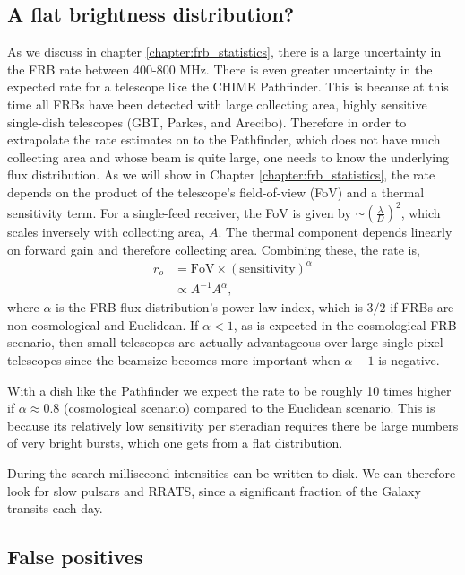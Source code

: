 \subsection{A flat brightness distribution?}
As we discuss in chapter \ref{chapter:frb_statistics}, there is 
a large uncertainty in the FRB rate between 400-800 MHz. There 
is even greater uncertainty in the expected rate for a 
telescope like the CHIME Pathfinder. This is because at this time
all FRBs
have been detected with large collecting area, highly sensitive single-dish 
telescopes (GBT, Parkes, and Arecibo). Therefore in order to 
extrapolate the rate estimates on to the Pathfinder, which 
does not have much collecting area and whose beam is quite large, one 
needs to know the underlying flux distribution. As we will show 
in Chapter \ref{chapter:frb_statistics}, the rate depends on the product 
of the telescope's field-of-view (FoV) and a thermal sensitivity term. 
For a single-feed receiver, the FoV is given by 
$\sim \left(\frac{\lambda}{D}\right)^2$, which scales inversely with 
collecting area, $A$. The thermal component depends linearly
on forward gain and therefore collecting area. Combining these, 
the rate is, 
\begin{align}
r_o &= \textrm{FoV} \times \left(\textrm{sensitivity}\right)^\alpha\\
     & \propto A^{-1} A^\alpha,
\end{align}
where $\alpha$ is the FRB flux distribution's power-law index, which is 
$3/2$ if FRBs are non-cosmological and Euclidean. If $\alpha < 1$, 
as is expected in the cosmological FRB scenario, then 
small telescopes are actually advantageous over large single-pixel telescopes 
since the beamsize becomes more important when $\alpha-1$ is negative. 

With a dish like the Pathfinder
we expect the rate to be 
roughly 10 times higher if $\alpha\approx 0.8$ (cosmological scenario) 
compared to the Euclidean scenario. This is because its relatively 
low sensitivity per steradian requires there be large numbers 
of very bright bursts, which one gets from a flat distribution.

During the search 
millisecond intensities can be written to disk.  
We can therefore look for slow pulsars 
and RRATS, since a significant fraction of the Galaxy transits each day.
\subsection{False positives}

